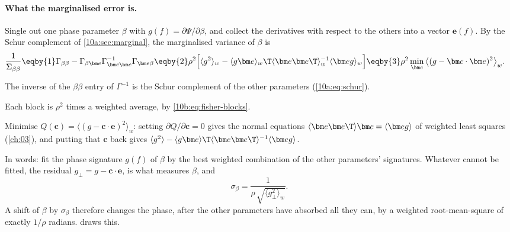 \paragraph{What the marginalised error is.} Single out one phase parameter $\beta$ with
$g(f)=\partial\Psi/\partial\beta$, and collect the derivatives with respect to the others into a vector $\bm e(f)$.
By the Schur complement of \cref{10a:sec:marginal}, the marginalised variance of $\beta$ is
\begin{align}
  \frac{1}{\Sigma_{\beta\beta}}
  &\eqby{1}\Gamma_{\beta\beta}-\Gamma_{\beta\bm e}\Gamma_{\bm e\bm e}^{-1}\Gamma_{\bm e\beta}
   \eqby{2}\rho^2\Big[\langle g^2\rangle_w-\langle g\bm e\rangle_w\T\langle\bm e\bm e\T\rangle_w^{-1}\langle\bm eg\rangle_w\Big]
   \eqby{3}\rho^2\min_{\bm c}\big\langle(g-\bm c\cdot\bm e)^2\big\rangle_w .
  \label{10b:eq:residual}
\end{align}
\begin{explain}
  \item The inverse of the $\beta\beta$ entry of $\Gamma^{-1}$ is the Schur complement of the other parameters
        (\cref{10a:eq:schur}).
  \item Each block is $\rho^2$ times a weighted average, by \eqref{10b:eq:fisher-blocks}.
  \item Minimise $Q(\bm c)=\langle(g-\bm c\cdot\bm e)^2\rangle_w$: setting $\partial Q/\partial\bm c=0$ gives the normal
        equations $\langle\bm e\bm e\T\rangle\bm c=\langle\bm eg\rangle$ of weighted least squares (\cref{ch:03}), and
        putting that $\bm c$ back gives $\langle g^2\rangle-\langle g\bm e\rangle\T\langle\bm e\bm e\T\rangle^{-1}\langle\bm eg\rangle$.
\end{explain}
In words: fit the phase signature $g(f)$ of $\beta$ by the best weighted combination of the other parameters'
signatures. Whatever cannot be fitted, the residual $g_\perp=g-\bm c\cdot\bm e$, is what measures $\beta$, and
\begin{equation}
  \sigma_\beta=\frac{1}{\rho\,\sqrt{\langle g_\perp^2\rangle_w}} .
  \label{10b:eq:sigma-residual}
\end{equation}
A shift of $\beta$ by $\sigma_\beta$ therefore changes the phase, after the other parameters have absorbed all they
can, by a weighted root-mean-square of exactly $1/\rho$ radians.  draws this.

